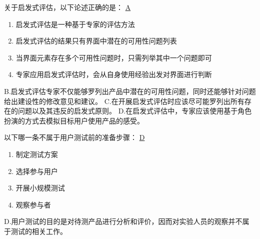 \begin{problem}
	‍关于启发式评估，以下论述正确的是：
	\uline{A}    
        \begin{enumerate}[label=\Alph*.]
            \item 启发式评估是一种基于专家的评估方法
            \item 启发式评估的结果只有界面中潜在的可用性问题列表
            \item 当界面元素存在多个可用性问题时，只需列举其中一个问题即可
            \item 专家应用启发式评估时，会从自身使用经验出发对界面进行判断
        \end{enumerate}
\end{problem}

\begin{solution}
B.启发式评估专家不仅能够罗列出产品中潜在的可用性问题，同时还能够针对问题给出建设性的修改意见和建议。  C.在开展启发式评估时应该尽可能罗列出所有存在的问题以及其违反的启发式原则。  D.在启发式评估中，专家应该使用基于角色扮演的方式去模拟目标用户使用产品的感受。
\end{solution}


\begin{problem}
	‍以下哪一条不属于用户测试前的准备步骤：
	\uline{D}    
    \vspace{-0.8em}
    \begin{multicols}{4}
        \begin{enumerate}[label=\Alph*.]
            \item 制定测试方案
            \item 选择参与用户
            \item 开展小规模测试
            \item 观察参与者
        \end{enumerate}
    \end{multicols}
    \vspace{-1em}
\end{problem}

\begin{solution}
D.用户测试的目的是对待测产品进行分析和评价，因而对实验人员的观察并不属于测试的相关工作。
\end{solution}


